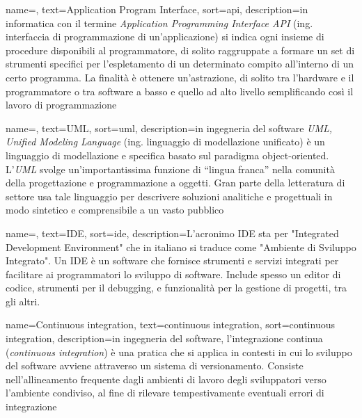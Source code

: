 
 {
    name=,
    text=Application Program Interface,
    sort=api,
    description={in informatica con il termine \emph{Application Programming Interface API} (ing. interfaccia di programmazione di un'applicazione) si indica ogni insieme di procedure disponibili al programmatore, di solito raggruppate a formare un set di strumenti specifici per l'espletamento di un determinato compito all'interno di un certo programma. La finalità è ottenere un'astrazione, di solito tra l'hardware e il programmatore o tra software a basso e quello ad alto livello semplificando così il lavoro di programmazione}
}

 {
    name=,
    text=UML,
    sort=uml,
    description={in ingegneria del software \emph{UML, Unified Modeling Language} (ing. linguaggio di modellazione unificato) è un linguaggio di modellazione e specifica basato sul paradigma object-oriented. L'\emph{UML} svolge un'importantissima funzione di ``lingua franca'' nella comunità della progettazione e programmazione a oggetti. Gran parte della letteratura di settore usa tale linguaggio per descrivere soluzioni analitiche e progettuali in modo sintetico e comprensibile a un vasto pubblico}
}

 {
    name=,
    text=IDE,
    sort=ide,
    description={L'acronimo IDE sta per "Integrated Development Environment" che in italiano si traduce come "Ambiente di Sviluppo Integrato". Un IDE è un software che fornisce strumenti e servizi integrati per facilitare ai programmatori lo sviluppo di software. Include spesso un editor di codice, strumenti per il debugging, e funzionalità per la gestione di progetti, tra gli altri.}
}

 {
    name=Continuous integration,
    text=continuous integration,
    sort=continuous integration,
    description={in ingegneria del software, l'integrazione continua (\textit{continuous integration}) è una pratica che si applica in contesti in cui lo sviluppo del software avviene attraverso un sistema di versionamento. Consiste nell'allineamento frequente dagli ambienti di lavoro degli sviluppatori verso l'ambiente condiviso, al fine di rilevare tempestivamente eventuali errori di integrazione}
}

